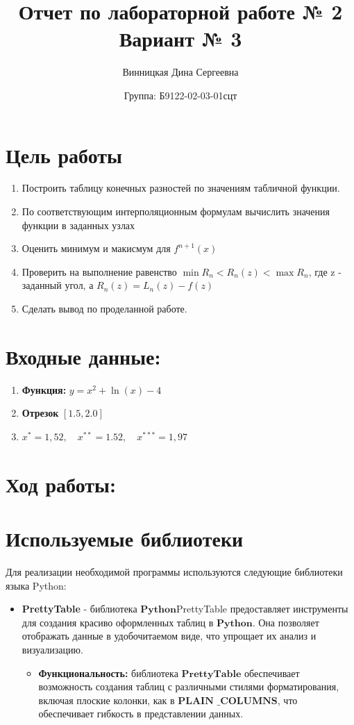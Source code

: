 \documentclass{article}
\title{Отчет по лабораторной работе № 2 \\ Вариант № 3}
\author{Винницкая Дина Сергеевна}
\date{Группа: Б9122-02-03-01сцт}
\begin{document}
\maketitle
\section*{Цель работы}
\begin{enumerate}
    \item Построить таблицу конечных разностей по значениям
табличной функции.
    \item По соответствующим интерполяционным формулам вычислить значения
функции в заданных узлах
    \item Оценить минимум и макисмум для $f^{n + 1}(x)$
    \item Проверить на выполнение равенство $ \min{R_n} < R_n(z) < \max{R_n}$, где z - заданный угол, а $R_n(z) = L_n(z) - f(z)$
    \item Сделать вывод по проделанной работе.
\end{enumerate}

\section*{Входные данные:}
\begin{enumerate}

    \item \textbf{Функция:} $y=x^2 + \ln(x) - 4$
    \item \textbf{Отрезок} $[1.5,2.0]$
    \item $x^{*} = 1,52, \quad x^{**} = 1.52, \quad x^{***} = 1,97$
    
\end{enumerate}

\section*{Ход работы:}

\section{Используемые библиотеки}
Для реализации необходимой программы используются следующие библиотеки языка Python:

\begin{itemize}
    \item \textbf{PrettyTable} - библиотека $\textbf{Python}$PrettyTable предоставляет инструменты для создания красиво оформленных таблиц в $\textbf{Python}$. Она позволяет отображать данные в удобочитаемом виде, что упрощает их анализ и визуализацию.
    \begin{itemize}
        \item \textbf{Функциональность:} библиотека $\textbf{PrettyTable}$ обеспечивает возможность создания таблиц с различными стилями форматирования, включая плоские колонки, как в  $\textbf{PLAIN \_COLUMNS}$, что обеспечивает гибкость в представлении данных.
    \end{itemize}
\end{itemize}
\end{document}
